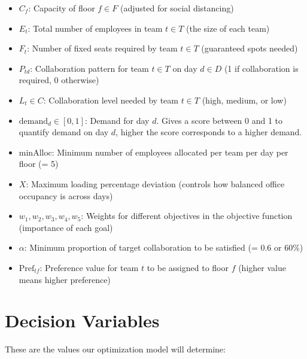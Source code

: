\documentclass[12pt,a4paper]{article}
\begin{document}
\begin{itemize}
\item $C_f$: Capacity of floor $f \in F$ (adjusted for social distancing)
\item $E_t$: Total number of employees in team $t \in T$ (the size of each team)
\item $F_t$: Number of fixed seats required by team $t \in T$ (guaranteed spots needed)
\item $P_{td}$: Collaboration pattern for team $t \in T$ on day $d \in D$ (1 if collaboration is required, 0 otherwise)
\item $L_t \in C$: Collaboration level needed by team $t \in T$ (high, medium, or low)
\item $\text{demand}_d \in [0,1]$: Demand for day $d$. Gives a score between 0 and 1 to quantify demand on day \(d\), higher the score corresponds to a higher demand. 
\item $\text{minAlloc}$: Minimum number of employees allocated per team per day per floor (= 5)
\item $X$: Maximum loading percentage deviation (controls how balanced office occupancy is across days)
\item $w_1, w_2, w_3, w_4, w_5$: Weights for different objectives in the objective function (importance of each goal)
\item $\alpha$: Minimum proportion of target collaboration to be satisfied (= 0.6 or 60\%)
\item $\text{Pref}_{tf}$: Preference value for team $t$ to be assigned to floor $f$ (higher value means higher preference)
\end{itemize}

\section{Decision Variables}

These are the values our optimization model will determine:
\end{document}
